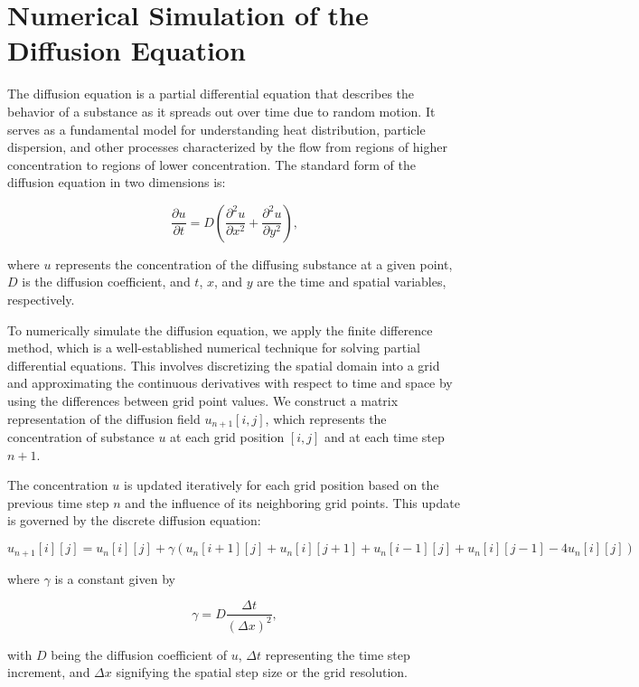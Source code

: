 \section{Numerical Simulation of the Diffusion Equation}\label{sec:contrib2:theme2}

The diffusion equation is a partial differential equation that describes the behavior of a substance as it spreads out over time due to random motion. It serves as a fundamental model for understanding heat distribution, particle dispersion, and other processes characterized by the flow from regions of higher concentration to regions of lower concentration. The standard form of the diffusion equation in two dimensions is:

\[
\frac{\partial u}{\partial t} = D \left( \frac{\partial^2 u}{\partial x^2} + \frac{\partial^2 u}{\partial y^2} \right),
\]

where $u$ represents the concentration of the diffusing substance at a given point, $D$ is the diffusion coefficient, and $t$, $x$, and $y$ are the time and spatial variables, respectively. {\footnotesize\cite{caltech}}

To numerically simulate the diffusion equation, we apply the finite difference method, which is a well-established numerical technique for solving partial differential equations. This involves discretizing the spatial domain into a grid and approximating the continuous derivatives with respect to time and space by using the differences between grid point values. We construct a matrix representation of the diffusion field \(u_{n+1}[i,j]\), which represents the concentration of substance \(u\) at each grid position \([i,j]\) and at each time step \(n+1\).

The concentration \(u\) is updated iteratively for each grid position based on the previous time step \(n\) and the influence of its neighboring grid points. This update is governed by the discrete diffusion equation:

\[
u_{n+1}[i][j] = u_{n}[i][j] + \gamma  \left( u_{n}[i+1][j] + u_{n}[i][j+1] + u_{n}[i-1][j] + u_{n}[i][j-1] - 4  u_{n}[i][j] \right)
\]

where \(\gamma\) is a constant given by 

\[ \gamma = D \frac{{\Delta t}}{{(\Delta x)^2}},  \]

with \(D\) being the diffusion coefficient of $u$, \(\Delta t\) representing the time step increment, and \(\Delta x\) signifying the spatial step size or the grid resolution. {\footnotesize\cite{gitconnectedSolvingHeat}\cite{unimuenster}}

